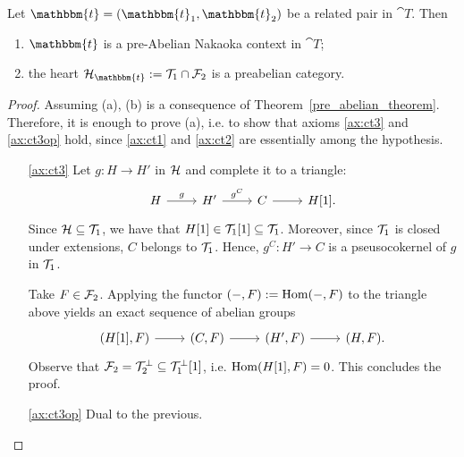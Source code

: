 \begin{prop}\label{prop:2.5}
  Let $\mathbbm{t}=(\mathbbm{t}_1,\mathbbm{t}_2)$ be a related pair in $\cat{T}$. Then
  \begin{enumerate}[label=(\alph*)]
    \item\label{prop:2.5:b} $\mathbbm{t}$ is a pre-Abelian Nakaoka context in $\cat{T}$;
    \item the heart $\mathcal{H}_\mathbbm{t} := \mathcal{T}_1\cap\mathcal{F}_2$ is a preabelian category.
  \end{enumerate}
\end{prop}

\begin{proof}
  Assuming (a), (b) is a consequence of Theorem~\ref{pre_abelian_theorem}. Therefore, it is enough to prove (a), i.e. to show that axioms \ref{ax:ct3} and \ref{ax:ct3op} hold, since \ref{ax:ct1} and \ref{ax:ct2} are essentially among the hypothesis.

  \begin{itemize}
    \item[\ref{ax:ct3}] Let $g:H\to H'$ in $\mathcal{H}$ and complete it to a triangle:
      \begin{equation*}
        \begin{tikzcd}
          H\arrow{r}{g}&H'\arrow{r}{g^C}&C\arrow{r}&H[1].
        \end{tikzcd}
      \end{equation*}
      Since $\mathcal{H}\subseteq \mathcal{T}_1$, we have that $H[1]\in\mathcal{T}_1[1]\subseteq \mathcal{T}_1$. Moreover, since $\mathcal{T}_1$ is closed under extensions, $C$ belongs to $\mathcal{T}_1$. Hence, $g^C:H'\to C$ is a pseusocokernel of $g$ in $\mathcal{T}_1$.

      Take $F\in\mathcal{F}_2$. Applying the functor $(-,F):=\operatorname{Hom}(-,F)$ to the triangle above yields an exact sequence of abelian groups
      \begin{equation*}
        \begin{tikzcd}
          (H[1],F)\arrow{r}&(C,F)\arrow{r}&(H',F)\arrow{r}&(H,F).
        \end{tikzcd}
      \end{equation*}
      Observe that $\mathcal{F}_2=\mathcal{T}_2^\perp \subseteq \mathcal{T}_1^\perp[1]$, i.e. $\operatorname{Hom}(H[1],F)=0$. This concludes the proof.
    \item[\ref{ax:ct3op}] Dual to the previous.
  \end{itemize}
\end{proof}

